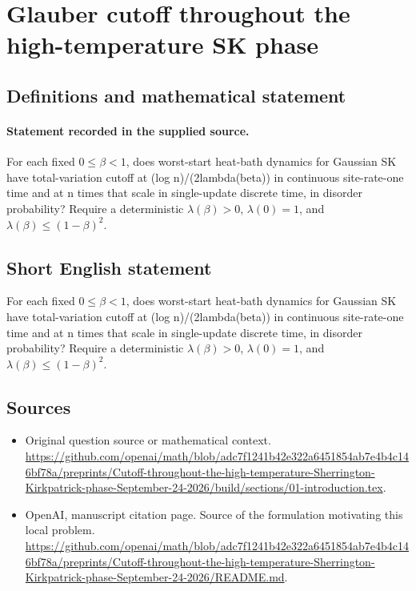 \documentclass[11pt]{article}
\begin{document}
\section*{Glauber cutoff throughout the high-temperature SK phase}\label{statement}
\subsection{Definitions and mathematical statement}
\paragraph{Statement recorded in the supplied source.}
For each fixed $0\leq \beta <1$, does worst-start heat-bath dynamics for Gaussian SK have total-variation cutoff at (log n)/(2lambda(beta)) in continuous site-rate-one time and at n times that scale in single-update discrete time, in disorder probability? Require a deterministic $\lambda (\beta )>0$, $\lambda (0)=1$, and $\lambda (\beta )\leq (1-\beta )^2$.
\subsection{Short English statement}
For each fixed $0\leq \beta <1$, does worst-start heat-bath dynamics for Gaussian SK have total-variation cutoff at (log n)/(2lambda(beta)) in continuous site-rate-one time and at n times that scale in single-update discrete time, in disorder probability? Require a deterministic $\lambda (\beta )>0$, $\lambda (0)=1$, and $\lambda (\beta )\leq (1-\beta )^2$.
\subsection{Sources}
\begin{itemize}
\item[S1] Original question source or mathematical context.
\url{https://github.com/openai/math/blob/adc7f1241b42e322a6451854ab7e4b4c146bf78a/preprints/Cutoff-throughout-the-high-temperature-Sherrington-Kirkpatrick-phase-September-24-2026/build/sections/01-introduction.tex}.
\item[S2] OpenAI, manuscript citation page. Source of the formulation motivating this local problem.
\url{https://github.com/openai/math/blob/adc7f1241b42e322a6451854ab7e4b4c146bf78a/preprints/Cutoff-throughout-the-high-temperature-Sherrington-Kirkpatrick-phase-September-24-2026/README.md}.
\end{itemize}
\end{document}
